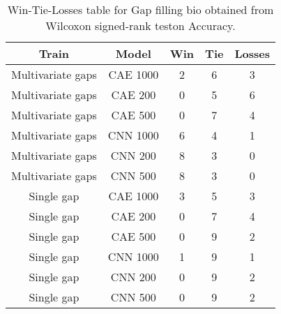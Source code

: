 \begin{table}[H]
\centering
\begin{tabular}{|c|c|c|c|c|}

    \textbf{Train} & \textbf{Model} &  \textbf{Win} &  \textbf{Tie} &  \textbf{Losses} \\
\hline

 Multivariate gaps &       CAE 1000 &             2 &             6 &                3 \\
\hline
 Multivariate gaps &        CAE 200 &             0 &             5 &                6 \\
\hline
 Multivariate gaps &        CAE 500 &             0 &             7 &                4 \\
\hline
 Multivariate gaps &       CNN 1000 &             6 &             4 &                1 \\
\hline
 Multivariate gaps &        CNN 200 &             8 &             3 &                0 \\
\hline
 Multivariate gaps &        CNN 500 &             8 &             3 &                0 \\
\hline
        Single gap &       CAE 1000 &             3 &             5 &                3 \\
\hline
        Single gap &        CAE 200 &             0 &             7 &                4 \\
\hline
        Single gap &        CAE 500 &             0 &             9 &                2 \\
\hline
        Single gap &       CNN 1000 &             1 &             9 &                1 \\
\hline
        Single gap &        CNN 200 &             0 &             9 &                2 \\
\hline
        Single gap &        CNN 500 &             0 &             9 &                2 \\
\hline

\end{tabular}
\caption{Win-Tie-Losses table for Gap filling bio obtained from Wilcoxon signed-rank teston Accuracy.}
\label{tab:gap_filling_bio_model_training_data_comparison}
\end{table}